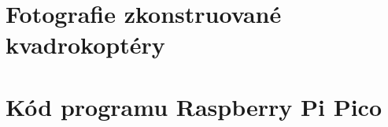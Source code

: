 \documentclass[12pt]{report}
\begin{document}
\begin{appendices}
	\chapter{Fotografie zkonstruované kvadrokoptéry}	
	\lipsum[1]
	\chapter{Kód programu Raspberry Pi Pico}  
\end{appendices}
\end{document}
